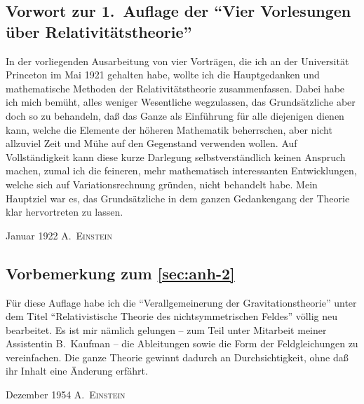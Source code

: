 

\subsection*{Vorwort zur 1.\ Auflage der \enquote{Vier Vorlesungen über Relativitätstheorie}}

In der vorliegenden Ausarbeitung von vier Vorträgen, die ich an der Universität Princeton im Mai 1921 gehalten habe, wollte ich die Hauptgedanken und mathematische Methoden der Relativitätstheorie zusammenfassen. Dabei habe ich mich bemüht, alles weniger Wesentliche wegzulassen, das Grundsätzliche aber doch so zu behandeln, daß das Ganze als Einführung für alle diejenigen dienen kann, welche die Elemente der höheren Mathematik beherrschen, aber nicht allzuviel Zeit und Mühe auf den Gegenstand verwenden wollen. Auf Vollständigkeit kann diese kurze Darlegung selbstverständlich keinen Anspruch machen, zumal ich die feineren, mehr mathematisch interessanten Entwicklungen, welche sich auf Variationsrechnung gründen, nicht behandelt habe. Mein Hauptziel war es, das Grundsätzliche in dem ganzen Gedankengang der Theorie klar hervortreten zu lassen.

Januar 1922 \hfill A.\ \textsc{Einstein} \hspace{1.5em}

\subsection*{Vorbemerkung zum \cref{sec:anh-2}}

Für diese Auflage habe ich die \enquote{Verallgemeinerung der Gravitationstheorie} unter dem Titel \enquote{Relativistische Theorie des nichtsymmetrischen Feldes} völlig neu bearbeitet. Es ist mir nämlich gelungen -- zum Teil unter Mitarbeit meiner Assistentin B.\ Kaufman -- die Ableitungen sowie die Form der Feldgleichungen zu vereinfachen. Die ganze Theorie gewinnt dadurch an Durchsichtigkeit, ohne daß ihr Inhalt eine Änderung erfährt.

Dezember 1954 \hfill A.\ \textsc{Einstein} \hspace{1.5em}

\tableofcontents
